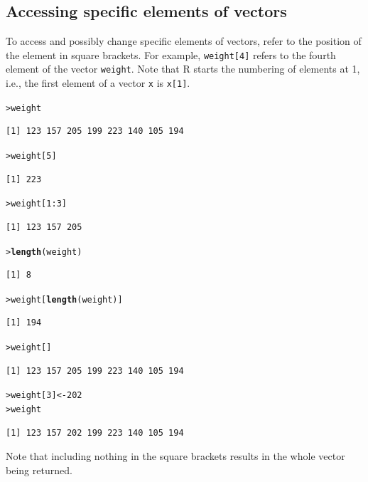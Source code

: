 \documentclass[12pt,oneside]{book}\usepackage[]{graphicx}\usepackage[]{color}
\makeatletter
\newcommand{\hlnum}[1]{\textcolor[rgb]{0.686,0.059,0.569}{#1}}%
\newcommand{\hlopt}[1]{\textcolor[rgb]{0,0,0}{#1}}%
\newcommand{\hlstd}[1]{\textcolor[rgb]{0.345,0.345,0.345}{#1}}%
\newcommand{\hlkwb}[1]{\textcolor[rgb]{0.69,0.353,0.396}{#1}}%
\newcommand{\hlkwd}[1]{\textcolor[rgb]{0.737,0.353,0.396}{\textbf{#1}}}%
\newenvironment{kframe}{%
 \def\at@end@of@kframe{}%
 \ifinner\ifhmode%
  \def\at@end@of@kframe{\end{minipage}}%
  \begin{minipage}{\columnwidth}%
 \fi\fi%
 \def\FrameCommand##1{\hskip\@totalleftmargin \hskip-\fboxsep
 \colorbox{shadecolor}{##1}\hskip-\fboxsep
     \hskip-\linewidth \hskip-\@totalleftmargin \hskip\columnwidth}%
 \MakeFramed {\advance\hsize-\width
   \@totalleftmargin\z@ \linewidth\hsize
   \@setminipage}}%
 {\par\unskip\endMakeFramed%
 \at@end@of@kframe}
\newenvironment{knitrout}{}{} %
\makeatother
\begin{document}
\subsection{Accessing specific elements of vectors}
To access and possibly change specific elements of vectors, refer to the position of the element in square brackets. For example, \verb+weight[4]+ refers to the fourth element of the vector \verb+weight+. Note that R starts the numbering of elements at 1, i.e., the first element of a vector \verb+x+ is \verb+x[1]+.
\begin{knitrout}
\color{fgcolor}\begin{kframe}
\begin{alltt}
\hlstd{> }\hlstd{weight}
\end{alltt}
\begin{verbatim}
[1] 123 157 205 199 223 140 105 194
\end{verbatim}
\begin{alltt}
\hlstd{> }\hlstd{weight[}\hlnum{5}\hlstd{]}
\end{alltt}
\begin{verbatim}
[1] 223
\end{verbatim}
\begin{alltt}
\hlstd{> }\hlstd{weight[}\hlnum{1}\hlopt{:}\hlnum{3}\hlstd{]}
\end{alltt}
\begin{verbatim}
[1] 123 157 205
\end{verbatim}
\begin{alltt}
\hlstd{> }\hlkwd{length}\hlstd{(weight)}
\end{alltt}
\begin{verbatim}
[1] 8
\end{verbatim}
\begin{alltt}
\hlstd{> }\hlstd{weight[}\hlkwd{length}\hlstd{(weight)]}
\end{alltt}
\begin{verbatim}
[1] 194
\end{verbatim}
\begin{alltt}
\hlstd{> }\hlstd{weight[]}
\end{alltt}
\begin{verbatim}
[1] 123 157 205 199 223 140 105 194
\end{verbatim}
\begin{alltt}
\hlstd{> }\hlstd{weight[}\hlnum{3}\hlstd{]} \hlkwb{<-} \hlnum{202}
\hlstd{> }\hlstd{weight}
\end{alltt}
\begin{verbatim}
[1] 123 157 202 199 223 140 105 194
\end{verbatim}
\end{kframe}
\end{knitrout}
Note that including nothing in the square brackets results in the whole vector being returned. 
\end{document}
